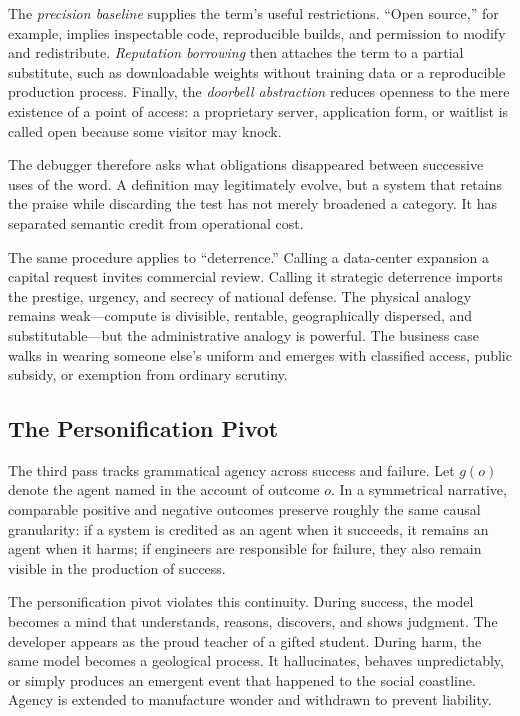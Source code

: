 \documentclass[11pt]{article}
\begin{document}
The \emph{precision baseline} supplies the term's useful restrictions. \enquote{Open source,} for example, implies inspectable code, reproducible builds, and permission to modify and redistribute. \emph{Reputation borrowing} then attaches the term to a partial substitute, such as downloadable weights without training data or a reproducible production process. Finally, the \emph{doorbell abstraction} reduces openness to the mere existence of a point of access: a proprietary server, application form, or waitlist is called open because some visitor may knock.

The debugger therefore asks what obligations disappeared between successive uses of the word. A definition may legitimately evolve, but a system that retains the praise while discarding the test has not merely broadened a category. It has separated semantic credit from operational cost.

The same procedure applies to \enquote{deterrence.} Calling a data-center expansion a capital request invites commercial review. Calling it strategic deterrence imports the prestige, urgency, and secrecy of national defense. The physical analogy remains weak---compute is divisible, rentable, geographically dispersed, and substitutable---but the administrative analogy is powerful. The business case walks in wearing someone else's uniform and emerges with classified access, public subsidy, or exemption from ordinary scrutiny.

\subsection{The Personification Pivot}

The third pass tracks grammatical agency across success and failure. Let \(g(o)\) denote the agent named in the account of outcome \(o\). In a symmetrical narrative, comparable positive and negative outcomes preserve roughly the same causal granularity: if a system is credited as an agent when it succeeds, it remains an agent when it harms; if engineers are responsible for failure, they also remain visible in the production of success.

The personification pivot violates this continuity. During success, the model becomes a mind that understands, reasons, discovers, and shows judgment. The developer appears as the proud teacher of a gifted student. During harm, the same model becomes a geological process. It hallucinates, behaves unpredictably, or simply produces an emergent event that happened to the social coastline. Agency is extended to manufacture wonder and withdrawn to prevent liability.
\end{document}
